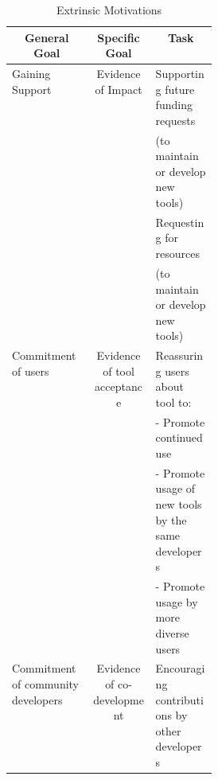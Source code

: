 \documentclass{article}
\begin{document}
\begin{table}
 \caption{Extrinsic Motivations}
  \centering
  \begin{tabular}{|l|c|p{0.3 \linewidth}|}
    \hline
    \multicolumn{1}{|c|}{\cellcolor[gray]{.9} \textbf{General Goal}} 
    & \multicolumn{1}{|c|}{\cellcolor[gray]{.9} \textbf{Specific Goal}}
    & \multicolumn{1}{|c|}{\cellcolor[gray]{.9} \textbf{Task}}\\[1.1ex] %
    \hline
    \multirow{4}{*}{Gaining Support}              
    & \multirow{4}{*}{Evidence of Impact} & 
    Supporting future funding requests \\
    & &
    (to maintain or develop new tools) \\
    & &
    Requesting for resources  \\
    & & 
    (to maintain or develop new tools) \\[1.1ex]
    \hline
    \multirow{4}{*}{ Commitment of users} 
    & \multirow{4}{*}{Evidence of tool acceptance} & 
    Reassuring users about tool to:\\
    &&
    - Promote continued use\\
    && 
    - Promote usage of new tools by the same developers \\ 
    &&
    - Promote usage by more diverse users \\[1.1ex]
    \hline
    \multirow{1}{*}{Commitment of community developers} 
    & \multirow{1}{*}{Evidence of co-development} & 
    Encouraging contributions by other developers \\
    \hline
  \end{tabular}
  \label{tab:ext_table}
\end{table}
\end{document}
